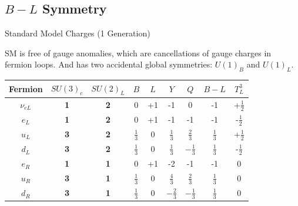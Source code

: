 \documentclass{../bredelebeamer}
\begin{document}
\subsection{$B-L$ Symmetry}
\begin{frame}{Standard Model Charges (1 Generation)}{}
{

\footnotesize
SM is free of gauge anomalies, which are cancellations of gauge charges in fermion loops. And has two accidental global symmetries: \(U(1)_B\) and \(U(1)_L\).
\begin{table}[h]
\centering
\begin{tabular}{|c|c|c|c|c|c|c|c|c|}
\hline
\textbf{Fermion} & \boldmath\(SU(3)_c\) & \boldmath\(SU(2)_L\) & \boldmath\(B\) & \boldmath\(L\) & \boldmath\(Y\) & \boldmath\(Q\) & \boldmath\(B-L\) & \boldmath\(T^3_L\) \bigstrut \\ \hline
\hline
\(\nu_{eL}\)     & \textbf{1}       & \textbf{2}       & 0    & +1   & -1    & 0      & -1     & +\(\frac{1}{2}\)  \bigstrut \\ \hline
\(e_L\)          & \textbf{1}       & \textbf{2}       & 0    & +1   & -1    & -1     & -1     & -\(\frac{1}{2}\)  \bigstrut \\ \hline
\hline
\(u_L\)          & \textbf{3}       & \textbf{2}       & \(\frac{1}{3}\) & 0 & \(\frac{1}{3}\) & \(\frac{2}{3}\) & \(\frac{1}{3}\) & +\(\frac{1}{2}\)  \bigstrut \\ \hline
\(d_L\)          & \textbf{3}       & \textbf{2}       & \(\frac{1}{3}\) & 0 & \(\frac{1}{3}\) & \(-\frac{1}{3}\) & \(\frac{1}{3}\) & -\(\frac{1}{2}\)  \bigstrut \\ \hline
\hline
\(e_R\)          & \textbf{1}       & \textbf{1}       & 0    & +1   & -2    & -1     & -1     & 0 \bigstrut \\ \hline
\hline
\(u_R\)          & \textbf{3}       & \textbf{1}       & \(\frac{1}{3}\) & 0 & \(\frac{4}{3}\) & \(\frac{2}{3}\) & \(\frac{1}{3}\) & 0 \bigstrut \\ \hline
\hline
\(d_R\)          & \textbf{3}       & \textbf{1}       & \(\frac{1}{3}\) & 0 & \(-\frac{2}{3}\) & \(-\frac{1}{3}\) & \(\frac{1}{3}\) & 0 \bigstrut \\ \hline
\end{tabular}
\end{table}

}
\end{frame}
\end{document}
